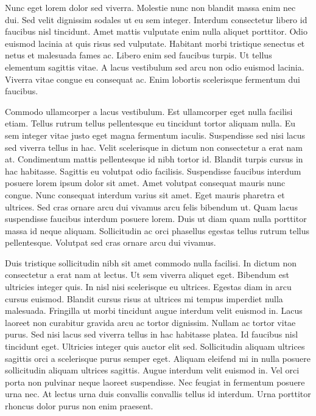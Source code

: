 \documentclass[11pt,a4paper]{article}
\begin{document}
Nunc eget lorem dolor sed viverra. Molestie nunc non blandit massa enim nec dui. Sed velit dignissim sodales ut eu sem integer. Interdum consectetur libero id faucibus nisl tincidunt. Amet mattis vulputate enim nulla aliquet porttitor. Odio euismod lacinia at quis risus sed vulputate. Habitant morbi tristique senectus et netus et malesuada fames ac. Libero enim sed faucibus turpis. Ut tellus elementum sagittis vitae. A lacus vestibulum sed arcu non odio euismod lacinia. Viverra vitae congue eu consequat ac. Enim lobortis scelerisque fermentum dui faucibus.

Commodo ullamcorper a lacus vestibulum. Est ullamcorper eget nulla facilisi etiam. Tellus rutrum tellus pellentesque eu tincidunt tortor aliquam nulla. Eu sem integer vitae justo eget magna fermentum iaculis. Suspendisse sed nisi lacus sed viverra tellus in hac. Velit scelerisque in dictum non consectetur a erat nam at. Condimentum mattis pellentesque id nibh tortor id. Blandit turpis cursus in hac habitasse. Sagittis eu volutpat odio facilisis. Suspendisse faucibus interdum posuere lorem ipsum dolor sit amet. Amet volutpat consequat mauris nunc congue. Nunc consequat interdum varius sit amet. Eget mauris pharetra et ultrices. Sed cras ornare arcu dui vivamus arcu felis bibendum ut. Quam lacus suspendisse faucibus interdum posuere lorem. Duis ut diam quam nulla porttitor massa id neque aliquam. Sollicitudin ac orci phasellus egestas tellus rutrum tellus pellentesque. Volutpat sed cras ornare arcu dui vivamus.

Duis tristique sollicitudin nibh sit amet commodo nulla facilisi. In dictum non consectetur a erat nam at lectus. Ut sem viverra aliquet eget. Bibendum est ultricies integer quis. In nisl nisi scelerisque eu ultrices. Egestas diam in arcu cursus euismod. Blandit cursus risus at ultrices mi tempus imperdiet nulla malesuada. Fringilla ut morbi tincidunt augue interdum velit euismod in. Lacus laoreet non curabitur gravida arcu ac tortor dignissim. Nullam ac tortor vitae purus. Sed nisi lacus sed viverra tellus in hac habitasse platea. Id faucibus nisl tincidunt eget. Ultricies integer quis auctor elit sed. Sollicitudin aliquam ultrices sagittis orci a scelerisque purus semper eget. Aliquam eleifend mi in nulla posuere sollicitudin aliquam ultrices sagittis. Augue interdum velit euismod in. Vel orci porta non pulvinar neque laoreet suspendisse. Nec feugiat in fermentum posuere urna nec. At lectus urna duis convallis convallis tellus id interdum. Urna porttitor rhoncus dolor purus non enim praesent.
\end{document}

